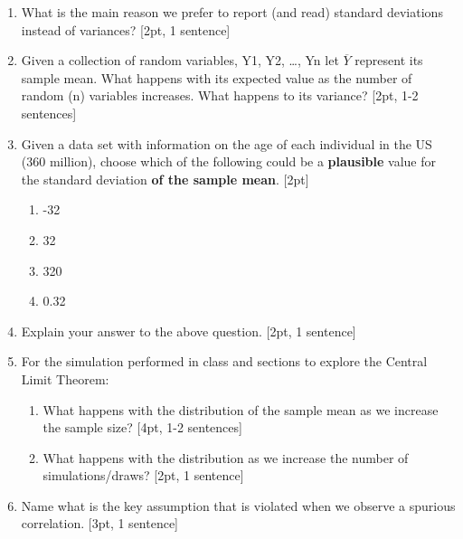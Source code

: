 \documentclass[12pt,notitlepage]{article}
\begin{document}
\begin{enumerate}
\newpage
	\item What is the main reason we prefer to report (and read) standard deviations instead of variances? [2pt, 1 sentence]
\vspace{3cm}
	\item Given a collection of random variables, Y1, Y2, …, Yn let $\overline{Y}$ represent its sample mean. What happens with its expected value as the number of random (n) variables increases. What happens to its variance? [2pt, 1-2 sentences]
\vspace{3cm}
	
\item Given a data set with information on the age of each individual in the US (360 million), choose which of the following could be a \textbf{plausible} value for the standard deviation\textbf{ of the sample mean}. [2pt]
\begin{enumerate}
    \item -32
    \item 32
    \item 320
    \item 0.32
\end{enumerate}
\vspace{1cm}

\item Explain your answer to the above question. [2pt, 1 sentence]
\vspace{3cm}

\item For the simulation performed in class and sections to explore the Central Limit Theorem: 
\begin{enumerate}
    \item What happens with the distribution of the sample mean as we increase the sample size? [4pt, 1-2 sentences]
    \vspace{3cm}
    \item What happens with the distribution as we increase the number of simulations/draws? [2pt, 1 sentence]
\end{enumerate}
\vspace{3cm}

\item Name what is the key assumption that is violated when we observe a spurious correlation. [3pt, 1 sentence]
\vspace{3cm}


\end{enumerate}
\end{document}
